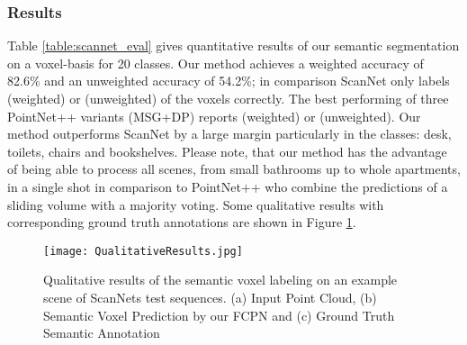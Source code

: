 \documentclass[runningheads]{llncs}
\begin{document}
\subsubsection{Results}

Table \ref{table:scannet_eval} gives quantitative results of our semantic segmentation on a voxel-basis for 20 classes. Our method achieves a weighted accuracy of 82.6\% and an unweighted accuracy of 54.2\%; in comparison ScanNet only labels  (weighted) or  (unweighted) of the voxels correctly. The best performing of three PointNet++ variants (MSG+DP) reports  (weighted) or  (unweighted). Our method outperforms ScanNet by a large margin particularly in the classes: desk, toilets, chairs and bookshelves. Please note, that our method has the advantage of being able to process all scenes, from small bathrooms up to whole apartments, in a single shot in comparison to PointNet++ who combine the predictions of a sliding volume with a majority voting. Some qualitative results with corresponding ground truth annotations are shown in Figure \ref{fig:qualitative_results}.

\begin{figure}[h!]
    \centering
 \texttt{[image: QualitativeResults.jpg]}
    \caption{Qualitative results of the semantic voxel labeling on an example scene of ScanNets test sequences. (a) Input Point Cloud, (b) Semantic Voxel Prediction by our FCPN and (c) Ground Truth Semantic Annotation}
    \label{fig:qualitative_results} 
\end{figure}
\newpage

\end{document}
